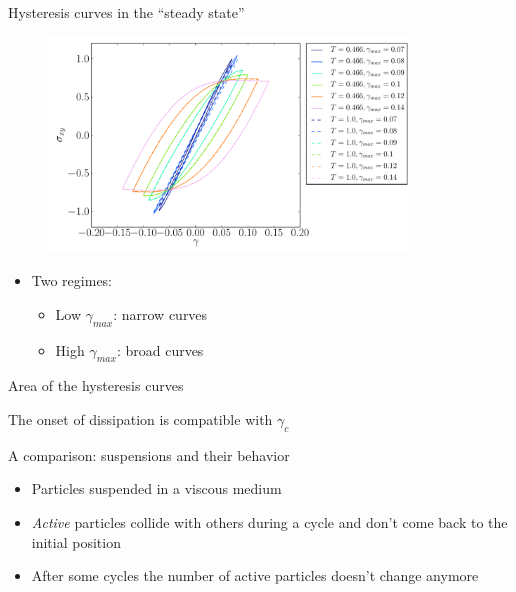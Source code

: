 \documentclass[compress]{beamer}
\begin{document}
	\begin{frame}{Hysteresis curves in the ``steady state''}

		\begin{figure}
			\includegraphics[width=0.85\textwidth]{Graphics/Graphs/HisteresisKA4000}
		\end{figure}

		\begin{itemize}
			\item<2-> Two regimes:
				\begin{itemize}
					\item Low $\gamma_{max}$: narrow curves
					\item High $\gamma_{max}$: broad curves
				\end{itemize}
		\end{itemize}
		
	\end{frame}

	\begin{frame}{Area of the hysteresis curves}

		\begin{figure}
		\end{figure}
		
		The onset of dissipation is compatible with $\gamma_{c}$ 
		
	\end{frame}

	\begin{frame}{A comparison: suspensions and their behavior}

		\begin{figure}
		\centering
		\end{figure}

		\begin{itemize}
			\item<1-> Particles suspended in a viscous medium
			\item<2-> \emph{Active} particles collide with others during a cycle and don't come back to the initial position
			\item<3-> After some cycles the number of active particles doesn't change anymore
		\end{itemize}
	
	\end{frame}
	
\end{document}
